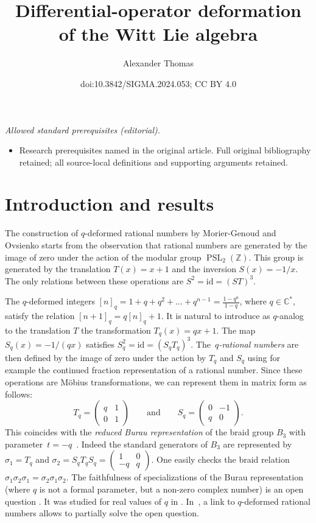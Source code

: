 \documentclass[10pt,a4paper]{amsart}
\title{Differential-operator deformation of the Witt Lie algebra}
\author{Alexander Thomas}
\date{doi:10.3842/SIGMA.2024.053; CC BY 4.0}
\numberwithin{equation}{section}
\newcommand*{\C}{\mathbb{C}}
\newcommand*{\Z}{\mathbb{Z}}
\DeclareMathOperator{\PSL}{PSL}
\begin{document}
\maketitle
\noindent\textit{Allowed standard prerequisites (editorial).}\begin{itemize}
\item Research prerequisites named in the original article. Full original bibliography retained; all source-local definitions and supporting arguments retained.
\end{itemize}\medskip
\section{Introduction and results}

The construction of $q$-deformed rational numbers by Morier-Genoud and Ovsienko \cite{morier2020continued} starts from the observation that rational numbers are generated by the image of zero under the action of the modular group $\PSL_2(\Z)$. This group is generated by the translation $T(x)=x+1$ and the inversion $S(x)=-1/x$. The only relations between these operations are $S^2=\mathrm{id}=(ST)^3$.

The $q$-deformed integers $[n]_q=1+q+q^2+\dots +q^{n-1}=\frac{1-q^n}{1-q}$, where $q\in \C^*$, satisfy the relation $[n+1]_q=q[n]_q+1$. It is natural to introduce as $q$-analog to the translation $T$ the transformation $T_q(x)=qx+1$. The map $S_q(x)=-1/(qx)$ satisfies $S_q^2=\mathrm{id}=(S_qT_q)^3$. The~\emph{$q$-rational numbers} are then defined by the image of zero under the action by $T_q$ and $S_q$ using for example the continued fraction representation of a rational number. Since these operations are M\"obius transformations, we can represent them in matrix form as follows:
\[
T_q=\begin{pmatrix} q&1\\ 0 & 1 \end{pmatrix}\qquad \text{and}\qquad S_q=\begin{pmatrix} 0&-1\\ q & 0 \end{pmatrix}.
\]
This coincides with the \emph{reduced Burau representation} of the braid group $B_3$ with parameter~${t=-q}$~\cite{burau}. Indeed the standard generators of $B_3$ are represented by $\sigma_1=T_q$ and $\sigma_2=S_qT_qS_q=\left(\begin{smallmatrix}1 & 0 \\ -q & q\end{smallmatrix}\right)$. One easily checks the braid relation $\sigma_1\sigma_2\sigma_1=\sigma_2\sigma_1\sigma_2$. The faithfulness of specializations of the Burau representation (where $q$ is not a formal parameter, but a non-zero complex number) is an open question \cite[Section 7]{bharathram2021burau}. It was studied for real values of $q$ in \cite{scherich2020classification}. In~\cite{morier2023}, a link to $q$-deformed rational numbers allows to partially solve the open question.
\end{document}
